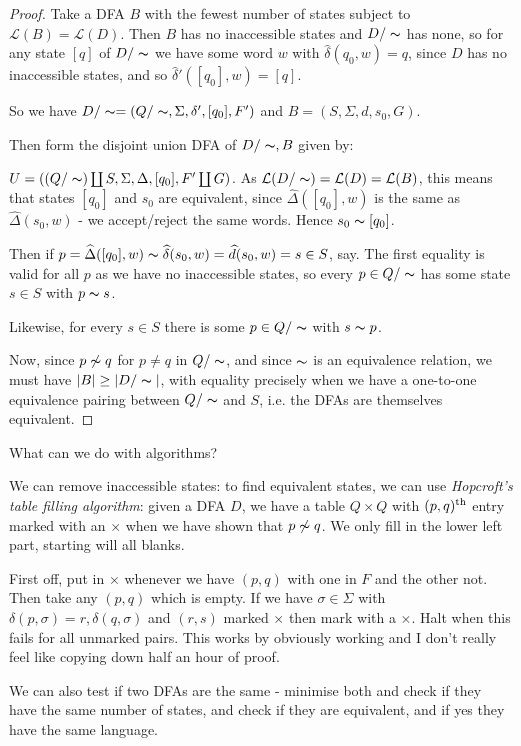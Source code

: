 \documentclass[10pt,a4paper]{article}
\begin{document}
\begin{proof}
Take a DFA $B$ with the fewest number of states subject to $\mathcal{L}(B) = \mathcal{L}(D)$. Then $B$ has no inaccessible states and $D/\thicksim$ has none, so for any state $[q]$ of $D/\thicksim$ we have some word $w$ with $\hat{\delta}(q_0, w) = q$, since $D$ has no inaccessible states, and so $\hat{\delta}'([q_0],w) = [q]$.

So we have $D/\thicksim = (Q/\thicksim, \Sigma, \delta', [q_0], F')$ and $B = (S,\Sigma, d, s_0, G)$.

Then form the disjoint union DFA of $D/\thicksim, B$ given by:

$U = ((Q/\thicksim )\coprod S, \Sigma, \Delta, [q_0], F'\coprod G)$. As $\mathcal{L}(D/\thicksim) = \mathcal{L}(D) = \mathcal{L}(B)$, this means that states $[q_0]$ and $s_0$ are equivalent, since $\hat{\Delta}([q_0],w)$ is the same as $\hat{\Delta}(s_0, w)$ - we accept/reject the same words. Hence $s_0 \thicksim [q_0]$.

Then if $p = \hat{\Delta}([q_0],w) \thicksim \hat{\delta}(s_0, w) = \hat{d}(s_0, w) = s \in S$, say. The first equality is valid for all $p$ as we have no inaccessible states, so every $p \in Q/\thicksim$ has some state $s \in S$ with $p \thicksim s$.

Likewise, for every $s \in S$ there is some $p \in Q/\thicksim$ with $s \thicksim p$.

Now, since $p \not\thicksim q$ for $p\neq q$ in $Q/\thicksim$, and since $\thicksim$ is an equivalence relation, we must have $|B| \geq |D/\thicksim|$, with equality precisely when we have a one-to-one equivalence pairing between $Q/\thicksim$ and $S$, i.e. the DFAs are themselves equivalent.
\end{proof}
What can we do with algorithms?

We can remove inaccessible states: to find equivalent states, we can use \emph{Hopcroft's table filling algorithm}: given a DFA $D$, we have a table $Q \times Q$ with $(p,q)\th$ entry marked with an $\times$ when we have shown that $p \not\thicksim q$. We only fill in the lower left part, starting will all blanks.

First off, put in $\times$ whenever we have $(p,q)$ with one in $F$ and the other not. Then take any $(p,q)$ which is empty. If we have $\sigma \in \Sigma$ with $\delta(p, \sigma) = r, \delta(q,\sigma)$ and $(r,s)$ marked $\times$ then mark with a $\times$. Halt when this fails for all unmarked pairs. This works by obviously working and I don't really feel like copying down half an hour of proof.

We can also test if two DFAs are the same - minimise both and check if they have the same number of states, and check if they are equivalent, and if yes they have the same language.
\end{document}
